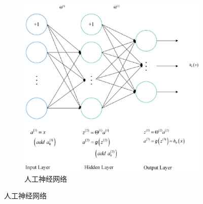 \begin{figure}[htp]
\begin{subfigure}{.33\textwidth}
	   \includegraphics[width=\linewidth]{imgs/2.2.09.eps}
	   \caption{人工神经网络}
	   \label{fig:2.sub.9}
	 \end{subfigure}


\end{figure}

